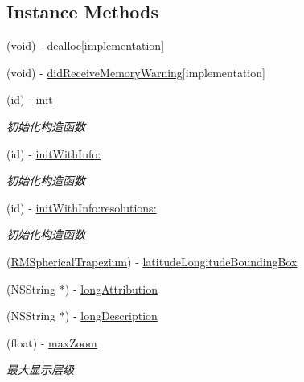 \subsection*{Instance Methods}
\begin{DoxyCompactItemize}
\item 
(void) -\/ \hyperlink{interface_r_m_s_m_tile_source_a0296a2e687e58fafb9cea51017033ba2}{dealloc}{\ttfamily  \mbox{[}implementation\mbox{]}}
\item 
(void) -\/ \hyperlink{interface_r_m_s_m_tile_source_a27c13d30f498d3595de3fc6a116426c2}{did\-Receive\-Memory\-Warning}{\ttfamily  \mbox{[}implementation\mbox{]}}
\item 
(id) -\/ \hyperlink{interface_r_m_s_m_tile_source_a30b28ef7183f78b02f3ca626b8034dde}{init}
\begin{DoxyCompactList}\small\item\em 初始化构造函数 \end{DoxyCompactList}\item 
(id) -\/ \hyperlink{interface_r_m_s_m_tile_source_a07a81b3f46b3c22a349463eefcb4a19a}{init\-With\-Info\-:}
\begin{DoxyCompactList}\small\item\em 初始化构造函数 \end{DoxyCompactList}\item 
(id) -\/ \hyperlink{interface_r_m_s_m_tile_source_a31f6d5290fa3b11c5374a43350327b0d}{init\-With\-Info\-:resolutions\-:}
\begin{DoxyCompactList}\small\item\em 初始化构造函数 \end{DoxyCompactList}\item 
(\hyperlink{struct_r_m_spherical_trapezium}{R\-M\-Spherical\-Trapezium}) -\/ \hyperlink{interface_r_m_s_m_tile_source_aba88e9911851370ec7e548b67f2e38e3}{latitude\-Longitude\-Bounding\-Box}
\item 
(N\-S\-String $\ast$) -\/ \hyperlink{interface_r_m_s_m_tile_source_af1656916b1f60fbc832028da125c4f48}{long\-Attribution}
\item 
(N\-S\-String $\ast$) -\/ \hyperlink{interface_r_m_s_m_tile_source_ac7faead0361e778ffa688f384ab58545}{long\-Description}
\item 
(float) -\/ \hyperlink{interface_r_m_s_m_tile_source_ab6f30ac52c66912316c0834a1856b52f}{max\-Zoom}
\begin{DoxyCompactList}\small\item\em 最大显示层级 \end{DoxyCompactList}\item 

\end{DoxyCompactItemize}
